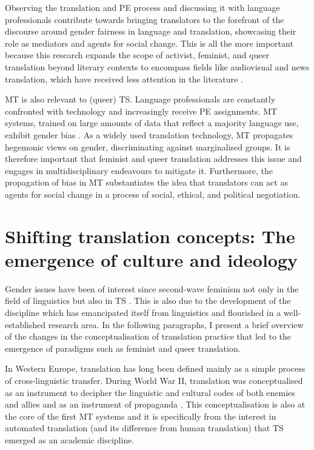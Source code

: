 Observing the translation and PE process and discussing it with language professionals contribute towards bringing translators to the forefront of the discourse around gender fairness in language and translation, showcasing their role as mediators and agents for social change. This is all the more important because this research expands the scope of activist, feminist, and queer translation beyond literary contexts to encompass fields like audiovisual and news translation, which have received less attention in the literature \citep{baer2018queering,von2020routledge}. 

MT is also relevant to (queer) TS. Language professionals are constantly confronted with technology and increasingly receive PE assignments. MT systems, trained on large amounts of data that reflect a majority language use, exhibit gender bias \citep{savoldi2021gender}. As a widely used translation technology, MT propagates hegemonic views on gender, discriminating against marginalised groups. It is therefore important that feminist and queer translation addresses this issue and engages in multidisciplinary endeavours to mitigate it. Furthermore, the propagation of bias in MT substantiates the idea that translators can act as agents for social change in a process of social, ethical, and political negotiation.


\section{Shifting translation concepts: The emergence of culture and ideology} \label{translationactivism}

Gender issues have been of interest since second-wave feminism not only in the field of linguistics but also in TS \citep{simon1996gender,von2016translation}. This is also due to the development of the discipline which has emancipated itself from linguistics and flourished in a well-established research area. In the following paragraphs, I present a brief overview of the changes in the conceptualisation of translation practice that led to the emergence of paradigms such as feminist and queer translation.

In Western Europe, translation has long been defined mainly as a simple process of cross-linguistic transfer. During World War II, translation was conceptualised as an instrument to decipher the linguistic and cultural codes of both enemies and allies and as an instrument of propaganda \citep[3]{tymoczko2010translation}. This conceptualisation is also at the core of the first MT systems \citep{hutchins2015machine} and it is specifically from the interest in automated translation (and its difference from human translation) that TS emerged as an academic discipline.

